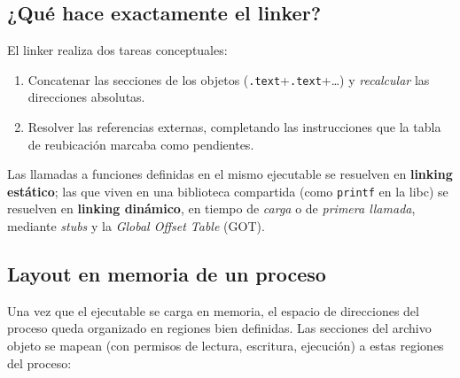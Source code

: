 \documentclass[11pt,a4paper]{article}
\begin{document}
\subsection*{¿Qué hace exactamente el linker?}

El linker realiza dos tareas conceptuales:

\begin{enumerate}[leftmargin=*]
    \item Concatenar las secciones de los objetos
        (\texttt{.text}+\texttt{.text}+\ldots) y \emph{recalcular} las
        direcciones absolutas.
    \item Resolver las referencias externas, completando las
        instrucciones que la tabla de reubicación marcaba como
        pendientes.
\end{enumerate}

Las llamadas a funciones definidas en el mismo ejecutable se resuelven
en \textbf{linking estático}; las que viven en una biblioteca
compartida (como \texttt{printf} en la libc) se resuelven en
\textbf{linking dinámico}, en tiempo de \emph{carga} o de
\emph{primera llamada}, mediante \emph{stubs} y la \emph{Global Offset
Table} (GOT).

\subsection*{Layout en memoria de un proceso}

Una vez que el ejecutable se carga en memoria, el espacio de
direcciones del proceso queda organizado en regiones bien definidas.
Las secciones del archivo objeto se mapean (con permisos de lectura,
escritura, ejecución) a estas regiones del proceso:
\end{document}
